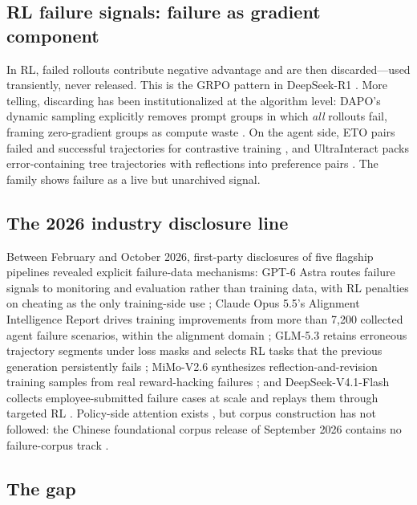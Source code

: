 \documentclass[10pt]{article}
\begin{document}
\subsection{RL failure signals: failure as gradient component}

In RL, failed rollouts contribute negative advantage and are then discarded---used transiently, never released. This is the GRPO pattern in DeepSeek-R1 \cite{deepseek2025r1}. More telling, discarding has been institutionalized at the algorithm level: DAPO's dynamic sampling explicitly removes prompt groups in which \emph{all} rollouts fail, framing zero-gradient groups as compute waste \cite{yu2025dapo}. On the agent side, ETO pairs failed and successful trajectories for contrastive training \cite{song2024eto}, and UltraInteract packs error-containing tree trajectories with reflections into preference pairs \cite{yuan2024ultrainteract}. The family shows failure as a live but unarchived signal.

\subsection{The 2026 industry disclosure line}

Between February and October 2026, first-party disclosures of five flagship pipelines revealed explicit failure-data mechanisms: GPT-6 Astra routes failure signals to monitoring and evaluation rather than training data, with RL penalties on cheating as the only training-side use \cite{openai2026gpt6}; Claude Opus 5.5's Alignment Intelligence Report drives training improvements from more than 7,200 collected agent failure scenarios, within the alignment domain \cite{anthropic2026claude}; GLM-5.3 retains erroneous trajectory segments under loss masks and selects RL tasks that the previous generation persistently fails \cite{zai2026glm5}; MiMo-V2.6 synthesizes reflection-and-revision training samples from real reward-hacking failures \cite{xiaomi2026mimo}; and DeepSeek-V4.1-Flash collects employee-submitted failure cases at scale and replays them through targeted RL \cite{deepseek2026v41}. Policy-side attention exists \cite{waic2026}, but corpus construction has not followed: the Chinese foundational corpus release of September 2026 contains no failure-corpus track \cite{cac2026corpus}.

\subsection{The gap}
\end{document}
